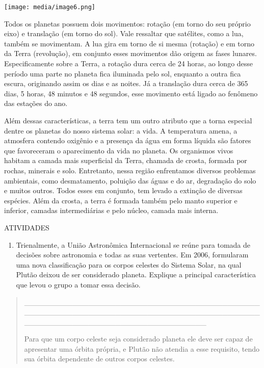 \texttt{[image: media/image6.png]}

Todos os planetas possuem dois movimentos: rotação (em torno do seu
próprio eixo) e translação (em torno do sol). Vale ressaltar que
satélites, como a lua, também se movimentam. A lua gira em torno de si
mesma (rotação) e em torno da Terra (revolução), em conjunto esses
movimentos dão origem as fases lunares. Especificamente sobre a Terra, a
rotação dura cerca de 24 horas, ao longo desse período uma parte no
planeta fica iluminada pelo sol, enquanto a outra fica escura,
originando assim os dias e as noites. Já a translação dura cerca de 365
dias, 5 horas, 48 minutos e 48 segundos, esse movimento está ligado ao
fenômeno das estações do ano.

Além dessas características, a terra tem um outro atributo que a torna
especial dentre os planetas do nosso sistema solar: a vida. A
temperatura amena, a atmosfera contendo oxigênio e a presença da água em
forma líquida são fatores que favoreceram o aparecimento da vida no
planeta. Os organismos vivos habitam a camada mais superficial da Terra,
chamada de crosta, formada por rochas, minerais e solo. Entretanto,
nessa região enfrentamos diversos problemas ambientais, como
desmatamento, poluição das águas e do ar, degradação do solo e muitos
outros. Todos esses em conjunto, tem levado a extinção de diversas
espécies. Além da crosta, a terra é formada também pelo manto superior e
inferior, camadas intermediárias e pelo núcleo, camada mais interna.

ATIVIDADES

\begin{enumerate}
\def\labelenumi{\arabic{enumi}.}
\item
  Trienalmente, a União Astronômica Internacional se reúne para tomada
  de decisões sobre astronomia e todas as suas vertentes. Em 2006,
  formularam uma nova classificação para os corpos celestes do Sistema
  Solar, na qual Plutão deixou de ser considerado planeta. Explique a
  principal característica que levou o grupo a tomar essa decisão.
\end{enumerate}

\begin{quote}
\_\_\_\_\_\_\_\_\_\_\_\_\_\_\_\_\_\_\_\_\_\_\_\_\_\_\_\_\_\_\_\_\_\_\_\_\_\_\_\_\_\_\_\_\_\_\_\_\_\_\_\_\_\_\_\_\_\_\_\_\_\_\_\_\_\_\_\_\_\_\_\_\_\_\_\_\_\_\_\_\_\_\_\_\_\_\_\_\_\_\_\_\_\_\_\_\_\_\_\_\_\_\_\_\_\_\_\_\_\_\_\_\_\_\_\_\_\_\_\_\_\_

Para que um corpo celeste seja considerado planeta ele deve ser capaz de
apresentar uma órbita própria, e Plutão não atendia a esse requisito,
tendo sua órbita dependente de outros corpos celestes.
\end{quote}

